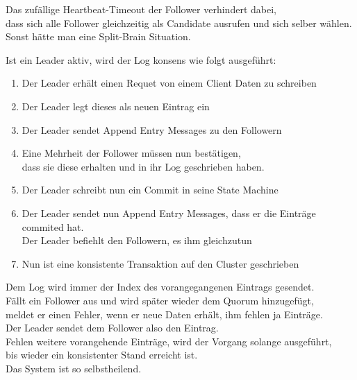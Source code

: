\begin{flushleft}
    Das zufällige Heartbeat-Timeout der Follower verhindert dabei,\\
    dass sich alle Follower gleichzeitig als Candidate ausrufen und sich selber wählen.\\
    Sonst hätte man eine Split-Brain Situation.
\end{flushleft}
\begin{flushleft}
    Ist ein Leader aktiv, wird der Log konsens wie folgt ausgeführt:
    \begin{enumerate}
        \item Der Leader erhält einen Requet von einem Client Daten zu schreiben
        \item Der Leader legt dieses als neuen Eintrag ein
        \item Der Leader sendet Append Entry Messages zu den Followern
        \item Eine Mehrheit der Follower müssen nun bestätigen,\\dass sie diese erhalten und in ihr Log geschrieben haben.
        \item Der Leader schreibt nun ein Commit in seine \Gls{State Machine}
        \item Der Leader sendet nun Append Entry Messages, dass er die Einträge commited hat.\\Der Leader befiehlt den Followern, es ihm gleichzutun
        \item Nun ist eine konsistente Transaktion auf den Cluster geschrieben
    \end{enumerate}
\end{flushleft}
\begin{flushleft}
    Dem Log wird immer der Index des vorangegangenen Eintrags gesendet.\\
    Fällt ein Follower aus und wird später wieder dem \Gls{Quorum} hinzugefügt,\\
    meldet er einen Fehler, wenn er neue Daten erhält, ihm fehlen ja Einträge.\\
    Der Leader sendet dem Follower also den Eintrag.\\
    Fehlen weitere vorangehende Einträge, wird der Vorgang solange ausgeführt,\\
    bis wieder ein konsistenter Stand erreicht ist.\\
    Das System ist so selbstheilend.
\end{flushleft}
